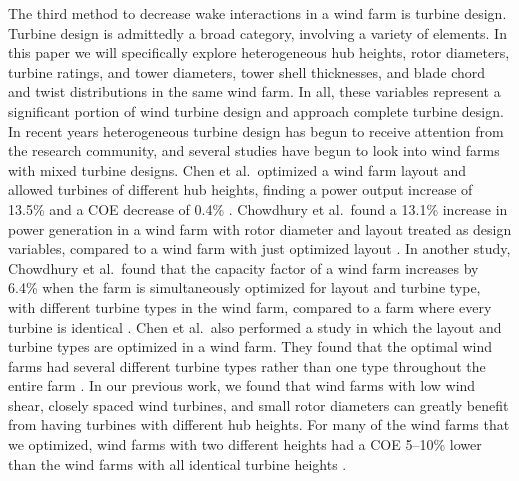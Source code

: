 The third method to decrease wake interactions in a wind farm is turbine design. Turbine design is admittedly a broad category, involving a variety of elements. In this paper we will specifically explore heterogeneous hub heights, rotor diameters, turbine ratings, and tower diameters, tower shell thicknesses, and blade chord and twist distributions in the same wind farm. In all, these variables represent a significant portion of wind turbine design and approach complete turbine design. 
In recent years heterogeneous turbine design has begun to receive attention from the research community, and several studies have begun to look into wind farms with mixed turbine designs. Chen et al.~optimized
a wind farm layout and allowed turbines of different hub heights, finding a power output increase of 13.5\% and a COE decrease of 0.4\% \citep{chen2013wind}. Chowdhury et al.~found
a 13.1\% increase in power generation in a wind farm with rotor diameter and layout treated as design variables, compared to a wind farm with just optimized layout \citep{chowdhury2010optimizing}. In another study, Chowdhury et al.~found that the capacity factor of a wind farm increases by 6.4\% when the farm is simultaneously optimized for layout and turbine type, with different turbine types in the wind farm, compared to a farm where every turbine is identical \citep{chowdhury2013optimizing}. Chen et al.~also performed a study in which the layout and turbine types are optimized in a wind farm. They found that the optimal wind farms had several different turbine types rather than one type throughout the entire farm \citep{chen2015multi}. In our previous work, we found that wind farms with low wind shear, closely spaced wind turbines, and small rotor diameters can greatly benefit from having turbines with different hub heights. For many of the wind farms that we optimized, wind farms with two different heights had a COE 5--10\% lower than the wind farms with all identical turbine heights \citep{stanley2018}.

